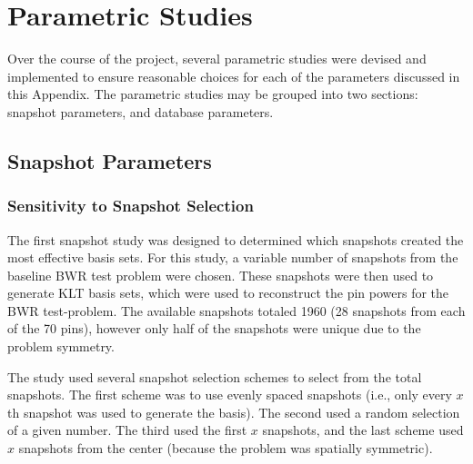 
\chapter{Parametric Studies} %

\label{AppendixA} %


Over the course of the project, several parametric studies were devised and 
implemented to ensure reasonable choices for each of the parameters discussed 
in this Appendix.  The parametric studies may be grouped into two sections: 
snapshot parameters, and database parameters.
  
\section{Snapshot Parameters}

\subsection{Sensitivity to Snapshot Selection}

The first snapshot study was designed to determined which snapshots created 
the most effective basis sets.  For this study, a variable number of snapshots 
from the baseline BWR test problem were chosen.  These snapshots were then 
used to generate KLT basis sets, which were used to reconstruct the pin powers 
for the BWR test-problem.  The available snapshots totaled 1960 (28 
snapshots from each of the 70 pins), however only half of the snapshots were 
unique due to the problem symmetry.  

The study used several snapshot selection schemes to 
select from the total snapshots.  The first scheme was to use evenly spaced 
snapshots (i.e., only every $x$th snapshot was used to generate the basis).  The 
second used a 
random selection of a given number.  The third used
the first $x$ snapshots, and the last scheme used $x$ snapshots from the 
center (because the problem was spatially symmetric). 

